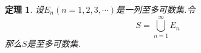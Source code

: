 \message{ !name(Math.tex)}\documentclass[UTF8]{ctexart}
\newtheorem{theorem}{定理}[section]
\begin{document}
\begin{theorem}
  设${E_n}(n=1,2,3,\cdots)$是一列至多可数集.令
  \[S=\bigcup\limits_{n=1}^\infty E_n\]
  那么$S$是至多可数集.
\end{theorem}
\end{document}
